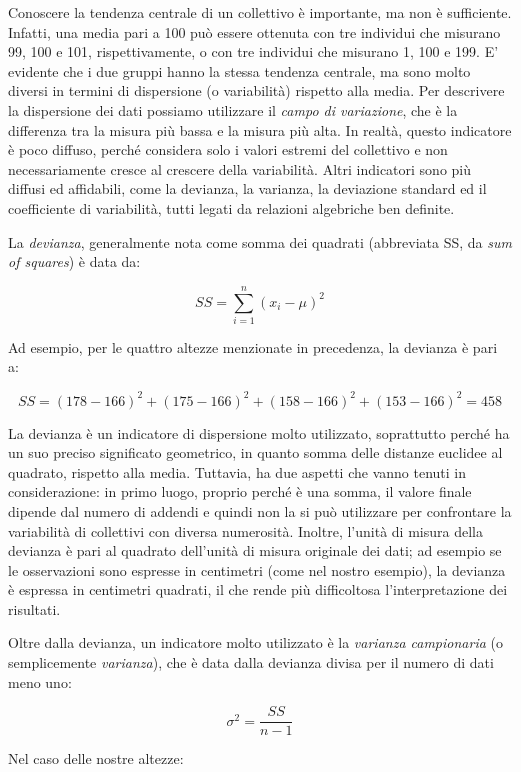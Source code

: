 \documentclass[
  12pt,
]{book}
\begin{document}
Conoscere la tendenza centrale di un collettivo è importante, ma non è sufficiente. Infatti, una media pari a 100 può essere ottenuta con tre individui che misurano 99, 100 e 101, rispettivamente, o con tre individui che misurano 1, 100 e 199. E' evidente che i due gruppi hanno la stessa tendenza centrale, ma sono molto diversi in termini di dispersione (o variabilità) rispetto alla media. Per descrivere la dispersione dei dati possiamo utilizzare il \emph{campo di variazione}, che è la differenza tra la misura più bassa e la misura più alta. In realtà, questo indicatore è poco diffuso, perché considera solo i valori estremi del collettivo e non necessariamente cresce al crescere della variabilità. Altri indicatori sono più diffusi ed affidabili, come la devianza, la varianza, la deviazione standard ed il coefficiente di variabilità, tutti legati da relazioni algebriche ben definite.

La \emph{devianza}, generalmente nota come somma dei quadrati (abbreviata SS, da \emph{sum of squares}) è data da:

\[SS = \sum\limits_{i = 1}^n {(x_i  - \mu)^2 }\]

Ad esempio, per le quattro altezze menzionate in precedenza, la devianza è pari a:

\[SS = \left(178 - 166 \right)^2 + \left(175 - 166 \right)^2 + \left(158 - 166 \right)^2  + \left(153 - 166 \right)^2 = 458\]

La devianza è un indicatore di dispersione molto utilizzato, soprattutto perché ha un suo preciso significato geometrico, in quanto somma delle distanze euclidee al quadrato, rispetto alla media. Tuttavia, ha due aspetti che vanno tenuti in considerazione: in primo luogo, proprio perché è una somma, il valore finale dipende dal numero di addendi e quindi non la si può utilizzare per confrontare la variabilità di collettivi con diversa numerosità. Inoltre, l'unità di misura della devianza è pari al quadrato dell'unità di misura originale dei dati; ad esempio se le osservazioni sono espresse in centimetri (come nel nostro esempio), la devianza è espressa in centimetri quadrati, il che rende più difficoltosa l'interpretazione dei risultati.

Oltre dalla devianza, un indicatore molto utilizzato è la \emph{varianza campionaria} (o semplicemente \emph{varianza}), che è data dalla devianza divisa per il numero di dati meno uno:

\[\sigma^2  = \frac{SS}{n - 1}\]

Nel caso delle nostre altezze:
\end{document}
